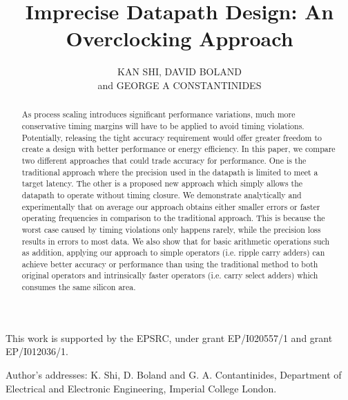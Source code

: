 \documentclass[prodmode,acmtrets]{acmsmall} %
\begin{document}

\title{Imprecise Datapath Design: An Overclocking Approach}
\author{KAN SHI, DAVID BOLAND\\
and GEORGE A CONSTANTINIDES
}


\begin{abstract}
As process scaling introduces significant performance variations, much more conservative timing margins will have to be applied to avoid timing violations. Potentially, releasing the tight accuracy requirement would offer greater freedom to create a design with better performance or energy efficiency. In this paper, we compare two different approaches that could trade accuracy for performance. One is the traditional approach where the precision used in the datapath is limited to meet a target latency. The other is a proposed new approach which simply allows the datapath to operate without timing closure. We demonstrate analytically and experimentally that on average our approach obtains either smaller errors or faster operating frequencies in comparison to the traditional approach. This is because the worst case caused by timing violations only happens rarely, while the precision loss results in errors to most data. We also show that for basic arithmetic operations such as addition, applying our approach to simple operators (i.e. ripple carry adders) can achieve better accuracy or performance than using the traditional method to both original operators and intrinsically faster operators (i.e. carry select adders) which consumes the same silicon area.
\end{abstract}





\begin{bottomstuff}
This work is supported by the EPSRC, under
grant EP/I020557/1 and grant EP/I012036/1.

Author's addresses: K. Shi, D. Boland {and} G. A. Contantinides,
Department of Electrical and Electronic Engineering,
Imperial College London.
\end{bottomstuff}
\end{document}
